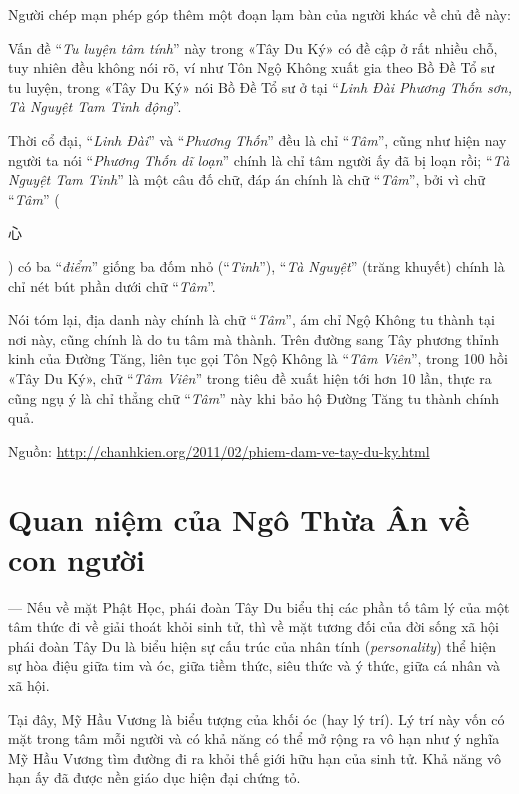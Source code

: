 \begin{small}
Người chép mạn phép góp thêm một đoạn lạm bàn của người khác về chủ đề này:

Vấn đề ``\emph{Tu luyện tâm tính}'' này trong «Tây Du Ký» có đề cập ở rất nhiều chỗ, tuy nhiên đều không nói rõ, ví như Tôn Ngộ Không xuất gia theo Bồ Đề Tổ sư tu luyện, trong «Tây Du Ký» nói Bồ Đề Tổ sư ở tại ``\emph{Linh Đài Phương Thốn sơn, Tà Nguyệt Tam Tinh động}''.

Thời cổ đại, ``\emph{Linh Đài}'' và ``\emph{Phương Thốn}'' đều là chỉ ``\emph{Tâm}'', cũng như hiện nay người ta nói ``\emph{Phương Thốn dĩ loạn}'' chính là chỉ tâm người ấy đã bị loạn rồi; ``\emph{Tà Nguyệt Tam Tinh}'' là một câu đố chữ, đáp án chính là chữ ``\emph{Tâm}'', bởi vì chữ ``\emph{Tâm}'' (\begin{CJK*}{UTF8}{bkai}心\end{CJK*}) có ba ``\emph{điểm}'' giống ba đốm nhỏ (``\emph{Tinh}''), ``\emph{Tà Nguyệt}'' (trăng khuyết) chính là chỉ nét bút phần dưới chữ ``\emph{Tâm}''.

Nói tóm lại, địa danh này chính là chữ ``\emph{Tâm}'', ám chỉ Ngộ Không tu thành tại nơi này, cũng chính là do tu tâm mà thành. Trên đường sang Tây phương thỉnh kinh của Đường Tăng, liên tục gọi Tôn Ngộ Không là ``\emph{Tâm Viên}'', trong 100 hồi «Tây Du Ký», chữ ``\emph{Tâm Viên}'' trong tiêu đề xuất hiện tới hơn 10 lần, thực ra cũng ngụ ý là chỉ thẳng chữ ``\emph{Tâm}'' này khi bảo hộ Đường Tăng tu thành chính quả.

Nguồn: \href{http://chanhkien.org/2011/02/phiem-dam-ve-tay-du-ky.html}{http://chanhkien.org/2011/02/phiem-dam-ve-tay-du-ky.html}
\end{small}

\hrulefill

\section{Quan niệm của Ngô Thừa Ân về con người} %
\label{sec:1_quan_niem_ve_con_nguoi}

--- Nếu về mặt Phật Học, phái đoàn Tây Du biểu thị các phần tố tâm lý của một tâm thức đi về giải thoát khỏi sinh tử, thì về mặt tương đối của đời sống xã hội phái đoàn Tây Du là biểu hiện sự cấu trúc của nhân tính (\emph{personality}) thể hiện sự hòa điệu giữa tim và óc, giữa tiềm thức, siêu thức và ý thức, giữa cá nhân và xã hội.

Tại đây, Mỹ Hầu Vương là biểu tượng của khối óc (hay lý trí). Lý trí này vốn có mặt trong tâm mỗi người và có khả năng có thể mở rộng ra vô hạn như ý nghĩa Mỹ Hầu Vương tìm đường đi ra khỏi thế giới hữu hạn của sinh tử. Khả năng vô hạn ấy đã được nền giáo dục hiện đại chứng tỏ.

